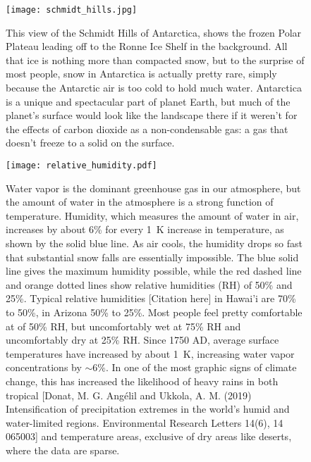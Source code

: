 \begin{figure}[p]
\centering
\texttt{[image: schmidt\_hills.jpg]}%
\caption{This view of the Schmidt Hills of Antarctica, shows the frozen Polar Plateau leading
off to the Ronne Ice Shelf in the background. All that ice is nothing more than compacted snow, but
to the surprise of most people, snow in Antarctica is actually pretty rare, simply because the Antarctic air
is too cold to hold much water. Antarctica is a unique and spectacular part of planet Earth, but
much of the planet's surface would look like the landscape there if it weren't for the effects
of carbon dioxide as a non-condensable gas: a gas that doesn't freeze to a solid on the surface.}   
\label{fig:schmidt_hills}
\end{figure}


\begin{figure}[p]
\centering
\texttt{[image: relative\_humidity.pdf]}%
\caption{Water vapor is the dominant greenhouse gas in our atmosphere, but the amount of water in the atmosphere is a strong function of temperature. Humidity, which measures the amount of water in air, increases by about 6\% for every \SI{1}{\kelvin} increase in temperature, as shown by the solid blue line. As air cools, the humidity drops so fast that substantial snow falls are essentially impossible. The blue solid line gives the maximum humidity possible, while the red dashed line and orange dotted lines show relative humidities (RH) of 50\% and 25\%. Typical relative humidities [Citation here] in Hawai'i are 70\% to 50\%, in Arizona 50\% to 25\%. Most people feel pretty comfortable at of 50\% RH, but uncomfortably wet at 75\% RH and uncomfortably dry at 25\% RH. Since 1750 AD, average surface temperatures have increased by about \SI{1}{\kelvin}, increasing water vapor concentrations by $\sim 6\%$. In one of the most graphic signs of climate change, this has increased the likelihood of heavy rains in both tropical [Donat, M. G. Ang\'{e}lil and Ukkola, A. M. (2019) Intensification of precipitation extremes in the world's humid and water-limited regions. Environmental Research Letters 14(6), 14 065003] and temperature areas, exclusive of dry areas like deserts, where the data are sparse.}   
\label{fig:relative_humidity}
\end{figure}

